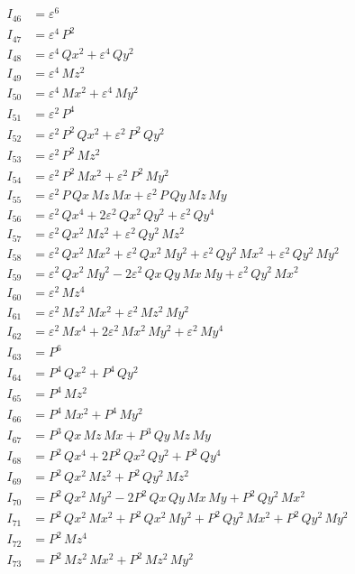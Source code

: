 \documentclass{article}
\begin{document}
\begin{align*}
I_{46} &= ε^{6} \\
I_{47} &= ε^{4}\,P^{2} \\
I_{48} &= ε^{4}\,Qx^{2} + ε^{4}\,Qy^{2} \\
I_{49} &= ε^{4}\,Mz^{2} \\
I_{50} &= ε^{4}\,Mx^{2} + ε^{4}\,My^{2} \\
I_{51} &= ε^{2}\,P^{4} \\
I_{52} &= ε^{2}\,P^{2}\,Qx^{2} + ε^{2}\,P^{2}\,Qy^{2} \\
I_{53} &= ε^{2}\,P^{2}\,Mz^{2} \\
I_{54} &= ε^{2}\,P^{2}\,Mx^{2} + ε^{2}\,P^{2}\,My^{2} \\
I_{55} &= ε^{2}\,P\,Qx\,Mz\,Mx + ε^{2}\,P\,Qy\,Mz\,My \\
I_{56} &= ε^{2}\,Qx^{4} + 2ε^{2}\,Qx^{2}\,Qy^{2} + ε^{2}\,Qy^{4} \\
I_{57} &= ε^{2}\,Qx^{2}\,Mz^{2} + ε^{2}\,Qy^{2}\,Mz^{2} \\
I_{58} &= ε^{2}\,Qx^{2}\,Mx^{2} + ε^{2}\,Qx^{2}\,My^{2} + ε^{2}\,Qy^{2}\,Mx^{2} + ε^{2}\,Qy^{2}\,My^{2} \\
I_{59} &= ε^{2}\,Qx^{2}\,My^{2} - 2ε^{2}\,Qx\,Qy\,Mx\,My + ε^{2}\,Qy^{2}\,Mx^{2} \\
I_{60} &= ε^{2}\,Mz^{4} \\
I_{61} &= ε^{2}\,Mz^{2}\,Mx^{2} + ε^{2}\,Mz^{2}\,My^{2} \\
I_{62} &= ε^{2}\,Mx^{4} + 2ε^{2}\,Mx^{2}\,My^{2} + ε^{2}\,My^{4} \\
I_{63} &= P^{6} \\
I_{64} &= P^{4}\,Qx^{2} + P^{4}\,Qy^{2} \\
I_{65} &= P^{4}\,Mz^{2} \\
I_{66} &= P^{4}\,Mx^{2} + P^{4}\,My^{2} \\
I_{67} &= P^{3}\,Qx\,Mz\,Mx + P^{3}\,Qy\,Mz\,My \\
I_{68} &= P^{2}\,Qx^{4} + 2P^{2}\,Qx^{2}\,Qy^{2} + P^{2}\,Qy^{4} \\
I_{69} &= P^{2}\,Qx^{2}\,Mz^{2} + P^{2}\,Qy^{2}\,Mz^{2} \\
I_{70} &= P^{2}\,Qx^{2}\,My^{2} - 2P^{2}\,Qx\,Qy\,Mx\,My + P^{2}\,Qy^{2}\,Mx^{2} \\
I_{71} &= P^{2}\,Qx^{2}\,Mx^{2} + P^{2}\,Qx^{2}\,My^{2} + P^{2}\,Qy^{2}\,Mx^{2} + P^{2}\,Qy^{2}\,My^{2} \\
I_{72} &= P^{2}\,Mz^{4} \\
I_{73} &= P^{2}\,Mz^{2}\,Mx^{2} + P^{2}\,Mz^{2}\,My^{2} \\

\end{align*}
\end{document}
